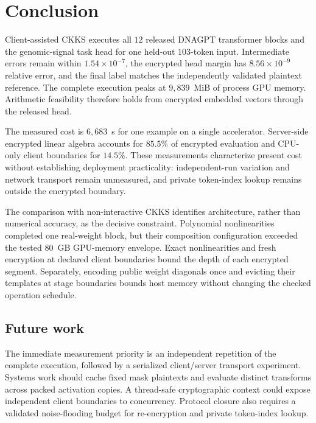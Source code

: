 
\section{Conclusion}

Client-assisted CKKS executes all $12$ released DNAGPT transformer blocks and the genomic-signal
task head for one held-out $103$-token input. Intermediate errors remain within
$1.54\times10^{-7}$, the encrypted head margin has $8.56\times10^{-9}$ relative error, and the
final label matches the independently validated plaintext reference. The complete execution peaks
at $9{,}839$~MiB of process GPU memory. Arithmetic feasibility therefore holds from encrypted
embedded vectors through the released head.

The measured cost is $6{,}683$~s for one example on a single accelerator. Server-side encrypted
linear algebra accounts for $85.5\%$ of encrypted evaluation and CPU-only client boundaries for
$14.5\%$. These measurements characterize present cost without establishing deployment
practicality: independent-run variation and network transport remain unmeasured, and private
token-index lookup remains outside the encrypted boundary.

The comparison with non-interactive CKKS identifies architecture, rather than numerical accuracy,
as the decisive constraint. Polynomial nonlinearities completed one real-weight block, but their
composition configuration exceeded the tested $80$~GB GPU-memory envelope. Exact nonlinearities and
fresh encryption at declared client boundaries bound the depth of each encrypted segment.
Separately, encoding public weight diagonals once and evicting their templates at stage boundaries
bounds host memory without changing the checked operation schedule.

\subsection*{Future work}

The immediate measurement priority is an independent repetition of the complete execution, followed
by a serialized client/server transport experiment. Systems work should cache fixed mask plaintexts
and evaluate distinct transforms across packed activation copies. A thread-safe cryptographic
context could expose independent client boundaries to concurrency. Protocol closure also requires a
validated noise-flooding budget for re-encryption and private token-index lookup.
